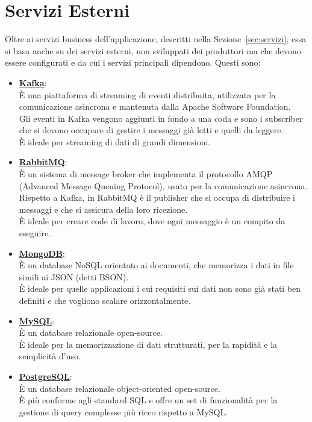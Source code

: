 \section{Servizi Esterni}
\label{sec:servizi_esterni}
Oltre ai servizi business dell'applicazione, descritti nella Sezione~\ref{sec:servizi}, essa si basa anche su dei servizi esterni, non sviluppati dei produttori ma che devono essere configurati e da cui i servizi principali dipendono. Questi sono:
\begin{itemize}
    \item \textbf{\href{https://kafka.apache.org}{Kafka}}: \\
        È una piattaforma di streaming di eventi distribuita, utilizzata per la comunicazione asincrona e mantenuta dalla Apache Software Foundation. \\
        Gli eventi in Kafka vengono aggiunti in fondo a una coda e sono i subscriber che si devono occupare di gestire i messaggi già letti e quelli da leggere. \\
        È ideale per streaming di dati di grandi dimensioni. \\
    \item \textbf{\href{https://www.rabbitmq.com}{RabbitMQ}}: \\
        È un sistema di message broker che implementa il protocollo AMQP (Advanced Message Queuing Protocol), usato per la comunicazione asincrona. \\
        Rispetto a Kafka, in RabbitMQ è il publisher che si occupa di distribuire i messaggi e che si assicura della loro ricezione. \\
        È ideale per creare code di lavoro, dove ogni messaggio è un compito da eseguire. \\
    \item \textbf{\href{https://www.mongodb.com/community/forums/t/mongodb-operator-install-instructions-for-minikube/10941}{MongoDB}}: \\
        È un database NoSQL orientato ai documenti, che memorizza i dati in file simili ai JSON (detti BSON). \\
        È ideale per quelle applicazioni i cui requisiti sui dati non sono già stati ben definiti e che vogliono scalare orizzontalmente. \\
    \item \textbf{\href{https://www.mysql.com/it/}{MySQL}}: \\
        È un database relazionale open-source. \\
        È ideale per la memorizzazione di dati strutturati, per la rapidità e la semplicità d'uso.
    \item \textbf{\href{https://www.postgresql.org/}{PostgreSQL}}: \\
        È un database relazionale object-oriented open-source. \\
        È più conforme agli standard SQL e offre un set di funzionalità per la gestione di query complesse più ricco rispetto a MySQL.
\end{itemize}

